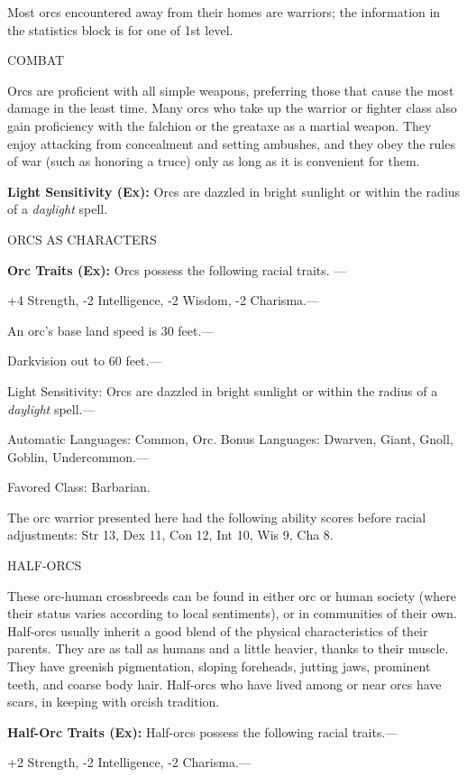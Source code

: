 \documentclass{article}
\begin{document}
Most orcs encountered away from their homes are warriors; the information in the 
statistics block is for one of 1st level.

COMBAT

Orcs are proficient with all simple weapons, preferring those that cause the most 
damage in the least time. Many orcs who take up the warrior or fighter class also 
gain proficiency with the falchion or the greataxe as a martial weapon. They enjoy 
attacking from concealment and setting ambushes, and they obey the rules of war 
(such as honoring a truce) only as long as it is convenient for them.

\textbf{Light Sensitivity (Ex):} Orcs are dazzled in bright sunlight or within 
the radius of a \textit{daylight }spell.

ORCS AS CHARACTERS

\textbf{Orc Traits (Ex):} Orcs possess the following racial traits. --- 

\parindent=3pt
+4 Strength, -2 Intelligence, -2 Wisdom, -2 Charisma.---

\parindent=0pt
An orc's base land speed is 30 feet.---

Darkvision out to 60 feet.---

Light Sensitivity: Orcs are dazzled in bright sunlight or within the radius of 
a \textit{daylight }spell.---

Automatic Languages: Common, Orc. Bonus Languages: Dwarven, Giant, Gnoll, Goblin, 
Undercommon.---

Favored Class: Barbarian.

The orc warrior presented here had the following ability scores before racial adjustments: 
Str 13, Dex 11, Con 12, Int 10, Wis 9, Cha 8.

HALF-ORCS

These orc-human crossbreeds can be found in either orc or human society (where 
their status varies according to local sentiments), or in communities of their 
own. Half-orcs usually inherit a good blend of the physical characteristics of 
their parents. They are as tall as humans and a little heavier, thanks to their 
muscle. They have greenish pigmentation, sloping foreheads, jutting jaws, prominent 
teeth, and coarse body hair. Half-orcs who have lived among or near orcs have scars, 
in keeping with orcish tradition.

\textbf{Half-Orc Traits (Ex):} Half-orcs possess the following racial traits.--- 

\parindent=3pt
+2 Strength, -2 Intelligence, -2 Charisma.---
\end{document}
